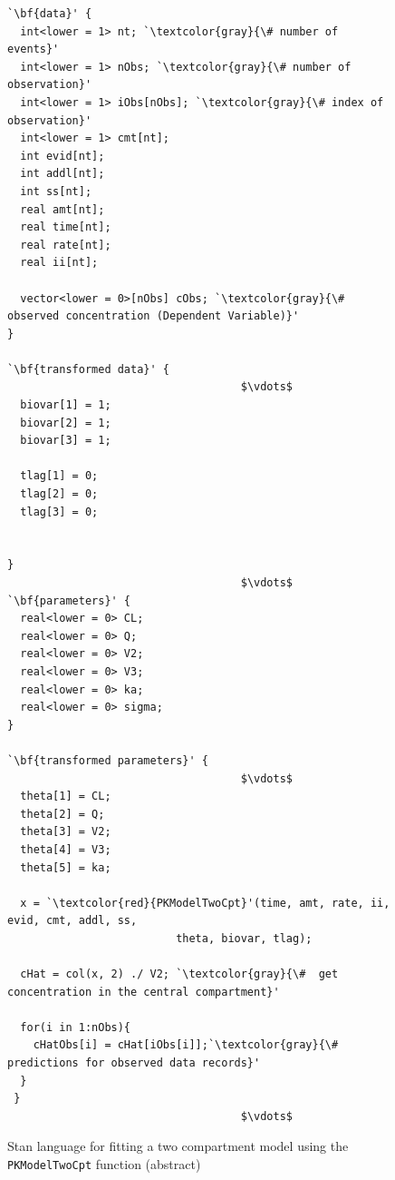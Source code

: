 \documentclass[11pt]{amsart}
\newenvironment{fmpage}[1]
     {\begin{lrbox}{\fmbox}\begin{minipage}{#1}}
     {\end{minipage}\end{lrbox}\fbox{\usebox{\fmbox}}}
\begin{document}
\begin{figure}[htbp]
\caption{Stan language for fitting a two compartment model using the \texttt{PKModelTwoCpt} function (abstract)}
\begin{center}
\begin{small}
\begin{fmpage}{\textwidth - .75in}
\begin{lstlisting}[basicstyle=\footnotesize\ttfamily,mathescape=true,flexiblecolumns=true,frame=single,escapeinside=`']
`\bf{data}' {
  int<lower = 1> nt; `\textcolor{gray}{\# number of events}'
  int<lower = 1> nObs; `\textcolor{gray}{\# number of observation}'
  int<lower = 1> iObs[nObs]; `\textcolor{gray}{\# index of observation}'
  int<lower = 1> cmt[nt];
  int evid[nt];
  int addl[nt];
  int ss[nt];
  real amt[nt];
  real time[nt];
  real rate[nt];
  real ii[nt];
  
  vector<lower = 0>[nObs] cObs; `\textcolor{gray}{\#  observed concentration (Dependent Variable)}'
}

`\bf{transformed data}' {
                                    $\vdots$
  biovar[1] = 1;
  biovar[2] = 1;
  biovar[3] = 1;
  
  tlag[1] = 0;
  tlag[2] = 0;
  tlag[3] = 0;                                    
                                    
                                     
}
                                    $\vdots$ 
`\bf{parameters}' {
  real<lower = 0> CL;
  real<lower = 0> Q;
  real<lower = 0> V2;
  real<lower = 0> V3;
  real<lower = 0> ka;
  real<lower = 0> sigma;
}

`\bf{transformed parameters}' {
                                    $\vdots$ 
  theta[1] = CL;
  theta[2] = Q;
  theta[3] = V2;
  theta[4] = V3;
  theta[5] = ka;

  x = `\textcolor{red}{PKModelTwoCpt}'(time, amt, rate, ii, evid, cmt, addl, ss, 
                          theta, biovar, tlag);

  cHat = col(x, 2) ./ V2; `\textcolor{gray}{\#  get concentration in the central compartment}'

  for(i in 1:nObs){
    cHatObs[i] = cHat[iObs[i]];`\textcolor{gray}{\# predictions for observed data records}'
  }
 }
                                    $\vdots$ 
\end{lstlisting}
\end{fmpage}
\end{small}
\end{center}
\label{TwoCptCode}
\end{figure}
\end{document}
